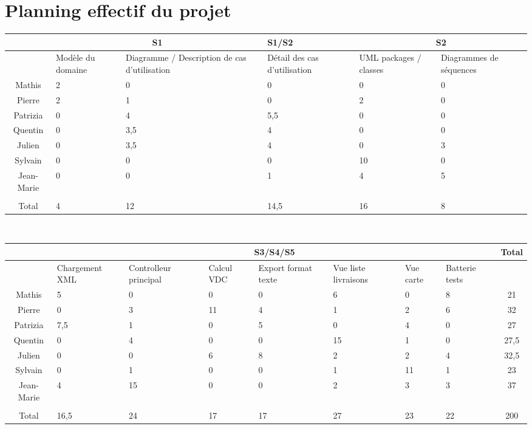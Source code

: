 \documentclass[a4paper]{report}
\begin{document}
\section{Planning effectif du projet}

\begin{tabular}{|c|p{2cm}|p{2cm}|p{2cm}|p{2.3cm}|p{2cm}|}
    \hline
    & \multicolumn{2}{|c|}{S1}  & S1/S2 & \multicolumn{2}{|c|}{S2} \\\hline
    & Modèle du domaine & Diagramme / Description de cas d'utilisation & Détail
    des cas d'utilisation & UML packages / classes & Diagrammes de séquences
    \\\hline
    Mathis & 2 & 0 & 0 & 0 & 0 \\\hline
    Pierre & 2 & 1 & 0 & 2 & 0 \\\hline
    Patrizia & 0 & 4 & 5,5 & 0 & 0 \\\hline
    Quentin & 0 & 3,5 & 4 & 0 & 0 \\\hline
    Julien & 0 & 3,5 & 4 & 0 & 3 \\\hline
    Sylvain & 0 & 0 & 0 & 10 & 0 \\\hline
    Jean-Marie & 0 & 0 & 1 & 4 & 5 \\\hline
    \multicolumn{6}{|c|}{} \\\hline
    Total & 4 & 12 & 14,5 & 16 & 8 \\\hline
\end{tabular}
~\\
\begin{tabular}{|c|p{2cm}|p{2cm}|p{1cm}|p{1cm}|p{1.7cm}|p{1cm}|p{1.3cm}|c|}
    \hline
    & \multicolumn{7}{|c|}{S3/S4/S5}  & Total  \\\hline
    & Chargement XML & Controlleur principal & Calcul VDC & Export format texte
    & Vue liste livraisons & Vue carte & Batterie tests &  \\\hline
    Mathis & 5 & 0 & 0 & 0 & 6 & 0 & 8 & 21 \\\hline
    Pierre & 0 & 3 & 11 & 4 & 1 & 2 & 6 & 32 \\\hline
    Patrizia & 7,5 & 1 & 0 & 5 & 0 & 4 & 0 & 27 \\\hline
    Quentin & 0 & 4 & 0 & 0 & 15 & 1 & 0 & 27,5 \\\hline
    Julien & 0 & 0 & 6 & 8 & 2 & 2 & 4 & 32,5 \\\hline
    Sylvain & 0 & 1 & 0 & 0 & 1 & 11 & 1 & 23 \\\hline
    Jean-Marie & 4 & 15 & 0 & 0 & 2 & 3 & 3 & 37 \\\hline
    \multicolumn{9}{|c|}{} \\\hline
    Total & 16,5 & 24 & 17 & 17 & 27 & 23 & 22 & 200 \\\hline
\end{tabular}
\end{document}
